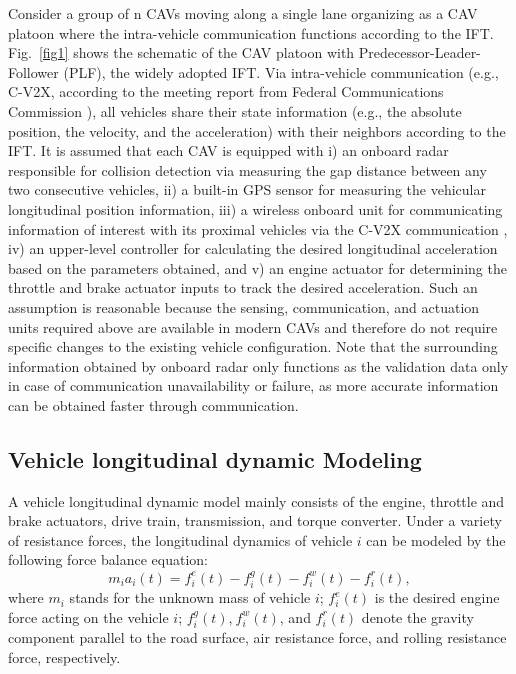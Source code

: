 \documentclass[a4paper]{cas-sc}
\begin{document}
Consider a group of n CAVs moving along a single lane organizing as a CAV platoon where the intra-vehicle communication functions according to the IFT. Fig.~\ref{fig1} shows the schematic of the CAV platoon with Predecessor-Leader-Follower (PLF), the widely adopted IFT. Via intra-vehicle communication (e.g., C-V2X, according to the meeting report from Federal Communications Commission \citep{POPEO2020}), all vehicles share their state information (e.g., the absolute position, the velocity, and the acceleration) with their neighbors according to the IFT. It is assumed that each CAV is equipped with i) an onboard radar responsible for collision detection via measuring the gap distance between any two consecutive vehicles, ii) a built-in GPS sensor for measuring the vehicular longitudinal position information, iii) a wireless onboard unit for communicating information of interest with its proximal vehicles via the C-V2X communication \citep{Mannoni2019}, iv) an upper-level controller for calculating the desired longitudinal acceleration based on the parameters obtained, and v) an engine actuator for determining the throttle and brake actuator inputs to track the desired acceleration. Such an assumption is reasonable because the sensing, communication, and actuation units required above are available in modern CAVs and therefore do not require specific changes to the existing vehicle configuration. Note that the surrounding information obtained by onboard radar only functions as the validation data only in case of communication unavailability or failure, as more accurate information can be obtained faster through communication.

\subsection{Vehicle longitudinal dynamic Modeling}
\label{Section 3.1}

A vehicle longitudinal dynamic model mainly consists of the engine, throttle and brake actuators, drive train, transmission, and torque converter. Under a variety of resistance forces, the longitudinal dynamics of vehicle $i$ can be modeled by the following force balance equation:
\begin{equation}
  m_ia_i(t)=f_i^e(t)-f_i^g(t)-f_i^w(t)-f_i^r(t),
  \label{eq1}
\end{equation}
where $m_i$ stands for the unknown mass of vehicle $i$; $f_i^e(t)$ is the desired engine force acting on the vehicle $i$; $f_i^g(t)$,$\ f_i^w(t)$, and $f_i^r(t)$ denote the gravity component parallel to the road surface, air resistance force, and rolling resistance force, respectively.
\end{document}
